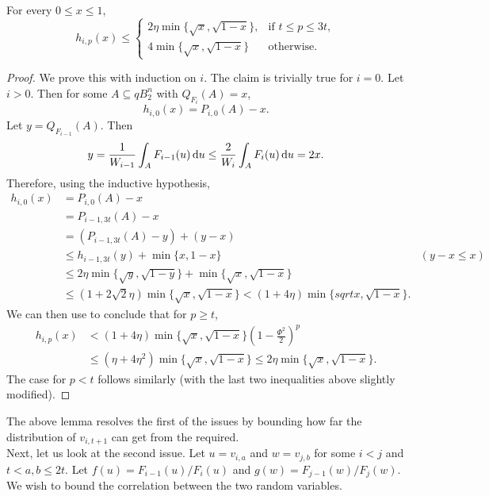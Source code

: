 \begin{lemma}
	\label{analysis lemma 1}
	For every $0\leq x\leq 1$,%
	\[
		h_{i,p}(x) \leq
		\begin{cases}
			2\eta\min\{\sqrt{x},\sqrt{1-x}\}, & \text{if } t\leq p\leq 3t, \\
			4\min\{\sqrt{x},\sqrt{1-x}\} & \text{otherwise.}
		\end{cases}
	\]
\end{lemma}
\begin{proof}
	We prove this with induction on $i$. The claim is trivially true for $i=0$. Let $i>0$. Then for some $A\subseteq qB_2^n$ with $Q_{F_i}(A)=x$,
	\[ h_{i,0}(x) = P_{i,0}(A) - x. \]
	Let $y=Q_{F_{i-1}}(A)$. Then
	\[ y = \frac{1}{W_{i-1}} \int_{A} F_{i-1}(u)\operatorname{d}\!{u} \leq \frac{2}{W_i}\int_{A} F_i(u)\operatorname{d}\!{u} = 2x. \]
	Therefore, using the inductive hypothesis,
	\begin{align*}
		h_{i,0}(x) &= P_{i,0}(A) - x \\
			&= P_{i-1,3t}(A) - x \\
			&= (P_{i-1,3t}(A) - y) + (y-x) \\
			&\leq h_{i-1,3t}(y) + \min\{x,1-x\} & (y-x\leq x) \\
			&\leq 2\eta\min\{\sqrt{y},\sqrt{1-y}\} + \min\{\sqrt{x},\sqrt{1-x}\} \\
			&\leq (1+2\sqrt{2}\eta) \min\{\sqrt{x},\sqrt{1-x}\} < (1+4\eta)\min\{sqrt{x},\sqrt{1-x}\}.
	\end{align*}
	We can then use  to conclude that for $p\geq t$,
	\begin{align*}
		h_{i,p}(x) &< (1+4\eta) \min\{\sqrt{x},\sqrt{1-x}\}\left(1-\frac{\Phi^2}{2}\right)^p \\
			&\leq (\eta+4\eta^2) \min\{\sqrt{x},\sqrt{1-x}\} \leq 2\eta \min\{\sqrt{x},\sqrt{1-x}\}.
	\end{align*}
	The case for $p<t$ follows similarly (with the last two inequalities above slightly modified).
\end{proof}

The above lemma resolves the first of the issues by bounding how far the distribution of $v_{i,t+1}$ can get from the required.\\

Next, let us look at the second issue. Let $u=v_{i,a}$ and $w=v_{j,b}$ for some $i<j$ and $t<a,b\leq 2t$. Let $f(u)=F_{i-1}(u)/F_i(u)$ and $g(w)=F_{j-1}(w)/F_j(w)$. We wish to bound the correlation between the two random variables.

